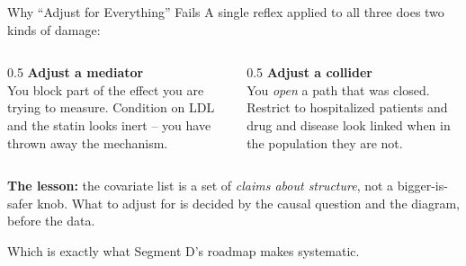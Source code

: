 \documentclass[aspectratio=169]{beamer}
\begin{document}
\begin{frame}{Why ``Adjust for Everything'' Fails}
  \small
  A single reflex applied to all three does two kinds of damage:
  \vspace{0.6em}

  \begin{columns}[T]
    \begin{column}{0.5\textwidth}
      \textcolor{brick}{\textbf{Adjust a mediator}} \\[0.2em]
      {\footnotesize You block part of the effect you are trying to measure.
      Condition on LDL and the statin looks inert -- you have thrown away
      the mechanism.}
    \end{column}
    \begin{column}{0.5\textwidth}
      \textcolor{brick}{\textbf{Adjust a collider}} \\[0.2em]
      {\footnotesize You \emph{open} a path that was closed. Restrict to
      hospitalized patients and drug and disease look linked when in the
      population they are not.}
    \end{column}
  \end{columns}
  \vspace{1.0em}

  \textcolor{accent}{\textbf{The lesson:}} the covariate list is a set of \emph{claims about structure}, not a bigger-is-safer knob. What to adjust for is decided by the causal question and the diagram, before the data.
  \vspace{0.4em}

  {\footnotesize Which is exactly what Segment D's roadmap makes systematic.}
\end{frame}
\end{document}
